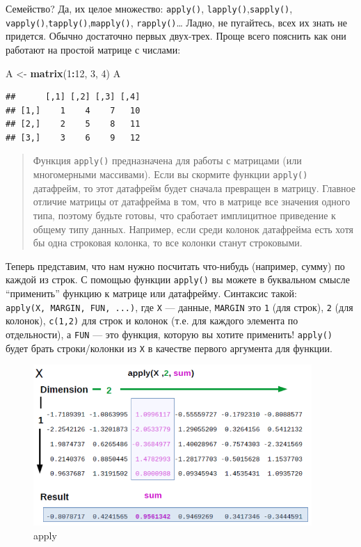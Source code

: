 \documentclass[]{book}
\newenvironment{Shaded}{\begin{snugshade}}{\end{snugshade}}
\newcommand{\KeywordTok}[1]{\textcolor[rgb]{0.13,0.29,0.53}{\textbf{#1}}}
\newcommand{\DecValTok}[1]{\textcolor[rgb]{0.00,0.00,0.81}{#1}}
\newcommand{\StringTok}[1]{\textcolor[rgb]{0.31,0.60,0.02}{#1}}
\newcommand{\OperatorTok}[1]{\textcolor[rgb]{0.81,0.36,0.00}{\textbf{#1}}}
\newcommand{\NormalTok}[1]{#1}
\begin{document}
Семейство? Да, их целое множество: \texttt{apply()},
\texttt{lapply()},\texttt{sapply()},
\texttt{vapply()},\texttt{tapply()},\texttt{mapply()},
\texttt{rapply()}\ldots{} Ладно, не пугайтесь, всех их знать не
придется. Обычно достаточно первых двух-трех. Проще всего пояснить как
они работают на простой матрице с числами:

\begin{Shaded}
\begin{Highlighting}[]
\NormalTok{A <-}\StringTok{ }\KeywordTok{matrix}\NormalTok{(}\DecValTok{1}\OperatorTok{:}\DecValTok{12}\NormalTok{, }\DecValTok{3}\NormalTok{, }\DecValTok{4}\NormalTok{)}
\NormalTok{A }
\end{Highlighting}
\end{Shaded}

\begin{verbatim}
##      [,1] [,2] [,3] [,4]
## [1,]    1    4    7   10
## [2,]    2    5    8   11
## [3,]    3    6    9   12
\end{verbatim}

\begin{quote}
Функция \texttt{apply()} предназначена для работы с матрицами (или
многомерными массивами). Если вы скормите функции \texttt{apply()}
датафрейм, то этот датафрейм будет сначала превращен в матрицу. Главное
отличие матрицы от датафрейма в том, что в матрице все значения одного
типа, поэтому будьте готовы, что сработает имплицитное приведение к
общему типу данных. Например, если среди колонок датафрейма есть хотя бы
одна строковая колонка, то все колонки станут строковыми.
\end{quote}

Теперь представим, что нам нужно посчитать что-нибудь (например, сумму)
по каждой из строк. С помощью функции \texttt{apply()} вы можете в
буквальном смысле ``применить'' функцию к матрице или датафрейму.
Синтаксис такой: \texttt{apply(X,\ MARGIN,\ FUN,\ ...)}, где \texttt{X}
--- данные, \texttt{MARGIN} это \texttt{1} (для строк), \texttt{2} (для
колонок), \texttt{c(1,2)} для строк и колонок (т.е. для каждого элемента
по отдельности), а \texttt{FUN} --- это функция, которую вы хотите
применить! \texttt{apply()} будет брать строки/колонки из \texttt{X} в
качестве первого аргумента для функции.

\begin{figure}
\centering
\includegraphics[width=4.16667in]{images/Apply_function.png}
\caption{apply}
\end{figure}
\end{document}
